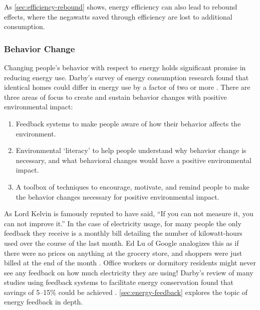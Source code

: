 As \autoref{sec:efficiency-rebound} shows, energy efficiency can also lead to rebound effects, where the negawatts saved through efficiency are lost to additional consumption.

\subsubsection{Behavior Change}

Changing people's behavior with respect to energy holds significant promise in reducing energy use. Darby's survey of energy consumption research found that identical homes could differ in energy use by a factor of two or more \cite{darby-review-2006}. There are three areas of focus to create and sustain behavior changes with positive environmental impact:

\begin{enumerate}

\item Feedback systems to make people aware of how their behavior affects the environment.

\item Environmental `literacy' to help people understand why behavior change is necessary, and what behavioral changes would have a positive environmental impact.

\item A toolbox of techniques to encourage, motivate, and remind people to make the behavior changes necessary for positive environmental impact.

\end{enumerate}

As Lord Kelvin is famously reputed to have said, ``If you can not measure it, you can not improve it.'' In the case of electricity usage, for many people the only feedback they receive is a monthly bill detailing the number of kilowatt-hours used over the course of the last month. Ed Lu of Google analogizes this as if there were no prices on anything at the grocery store, and shoppers were just billed at the end of the month \cite{Helft2008Googles-Energy}. Office workers or dormitory residents might never see any feedback on how much electricity they are using! Darby's review of many studies using feedback systems to facilitate energy conservation found that savings of 5--15\% could be achieved \cite{darby-review-2006}. \ref{sec:energy-feedback} explores the topic of energy feedback in depth.

